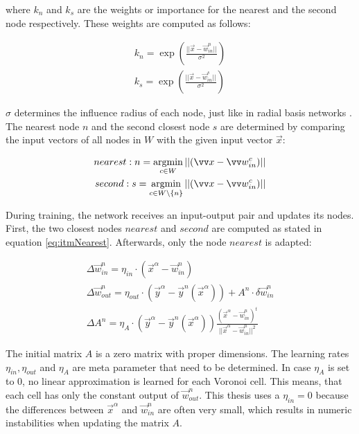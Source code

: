 where $k_n$ and $k_s$ are the weights or importance for the nearest and the second node respectively. These weights are computed as follows:

\begin{equation}
\begin{split}
k_n = \exp\left(\frac{||\vec{x}-\vec{w}^n_{in}||}{\sigma^2}\right) \\
k_s = \exp\left(\frac{||\vec{x}-\vec{w}^s_{in}||}{\sigma^2}\right) 
\end{split}
\end{equation}

$\sigma$ determines the influence radius of each node, just like in radial basis networks \cite{rbf}. The nearest node $n$ and the second closest node $s$ are determined by comparing the input vectors of all nodes in $W$ with the given input vector $\vec{x}$:

\begin{equation}
\begin{split}
	nearest: n = \argmin_{c\in W} ||(\vec{x} - \vec{w}^c_{in})|| \\
	second: s = \argmin_{c\in W\backslash\{n\}} ||(\vec{x} - \vec{w}^c_{in})||
\end{split}
\label{eq:itmNearest}
\end{equation}

During training, the network receives an input-output pair and updates its nodes. First, the two closest nodes $nearest$ and $second$ are computed as stated in equation \ref{eq:itmNearest}. Afterwards, only the node $nearest$ is adapted:

\begin{equation}
\begin{split}
\Delta \vec{w}^n_{in} = \eta_{in} \cdot (\vec{x}^\alpha - \vec{w}^n_{in}) \\
\Delta \vec{w}^n_{out} = \eta_{out} \cdot (\vec{y}^\alpha - \vec{y}^n(\vec{x}^\alpha)) + A^n \cdot \delta \vec{w}^n_{in} \\
\Delta A^n = \eta_A \cdot (\vec{y}^\alpha - \vec{y}^n(\vec{x}^\alpha)) \frac{(\vec{x}^\alpha - \vec{w}^n_{in})^t}{||\vec{x}^\alpha - \vec{w}^n_{in}||^2}
\end{split}
\end{equation}

The initial matrix $A$ is a zero matrix with proper dimensions. The learning rates $\eta_{in}, \eta_{out}$ and $\eta_A$ are meta parameter that need to be determined. In case $\eta_A$ is set to 0, no linear approximation is learned for each Voronoi cell. This means, that each cell has only the constant output of $\vec{w}^n_{out}$. This thesis uses a $\eta_{in} = 0$ because the differences between $\vec{x}^\alpha$ and  $\vec{w}^n_{in}$ are often very small, which results in numeric instabilities when updating the matrix $A$.

